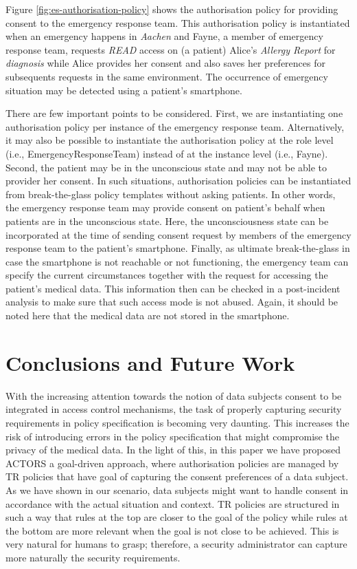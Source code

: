 \documentclass[10pt, conference, compsocconf]{IEEEtran}
\begin{document}
Figure \ref{fig:es-authorisation-policy} shows the authorisation policy for providing consent to the emergency response team. This authorisation policy is instantiated when an emergency happens in \emph{Aachen} and Fayne, a member of emergency response team, requests \emph{READ} access on (a patient) Alice's \emph{Allergy Report} for \emph{diagnosis} while Alice provides her consent and also saves her preferences for subsequents requests in the same environment. The occurrence of emergency situation may be detected using a patient's smartphone.

There are few important points to be considered. First, we are instantiating one authorisation policy per instance of the emergency response team. Alternatively, it may also be possible to instantiate the authorisation policy at the role level (i.e., EmergencyResponseTeam) instead of at the instance level (i.e., Fayne). Second, the patient may be in the unconscious state and may not be able to provider her consent. In such situations, authorisation policies can be instantiated from break-the-glass policy templates without asking patients. In other words, the emergency response team may provide consent on patient's behalf when patients are in the unconscious state. Here, the unconsciousness state can be incorporated at the time of sending consent request by members of the emergency response team to the patient's smartphone. Finally, as ultimate break-the-glass in case the smartphone is not reachable or not functioning, the emergency team can specify the current circumstances together with the request for accessing the patient's medical data. This information then can be checked in a post-incident analysis to make sure that such access mode is not abused. Again, it should be noted here that the medical data are not stored in the smartphone.

\section{Conclusions and Future Work}
\label{sec:conclusion_future_work}
With the increasing attention towards the notion of data subjects consent to be integrated in access control mechanisms, the task of properly capturing security requirements in policy specification is becoming very daunting. This increases the risk of introducing errors in the policy specification that might compromise the privacy of the medical data. In the light of this, in this paper we have proposed ACTORS a goal-driven approach, where authorisation policies are managed by TR policies that have goal of capturing the consent preferences of a data subject. As we have shown in our scenario, data subjects might want to handle consent in accordance with the actual situation and context. TR policies are structured in such a way that rules at the top are closer to the goal of the policy while rules at the bottom are more relevant when the goal is not close to be achieved. This is very natural for humans to grasp; therefore, a security administrator can capture more naturally the security requirements.
\end{document}
